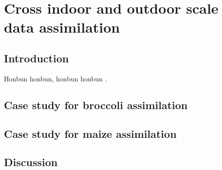 \chapter{Cross indoor and outdoor scale data assimilation}

\section{Introduction}

Honbun honbun, honbun honbun \citep{zhao_crop_2019}. 


\section{Case study for broccoli assimilation}


\section{Case study for maize assimilation}

\section{Discussion}